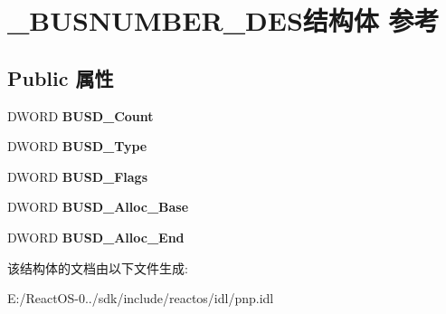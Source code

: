\hypertarget{struct___b_u_s_n_u_m_b_e_r___d_e_s}{}\section{\+\_\+\+B\+U\+S\+N\+U\+M\+B\+E\+R\+\_\+\+D\+E\+S结构体 参考}
\label{struct___b_u_s_n_u_m_b_e_r___d_e_s}
\subsection*{Public 属性}
\begin{DoxyCompactItemize}
\item 
\mbox{\label{struct___b_u_s_n_u_m_b_e_r___d_e_s_afd0ada43f638ac434c65653653af49df}} 
D\+W\+O\+RD {\bfseries B\+U\+S\+D\+\_\+\+Count}
\item 
\mbox{\label{struct___b_u_s_n_u_m_b_e_r___d_e_s_a9d095d940b0899429c6b247b5a2a5bb7}} 
D\+W\+O\+RD {\bfseries B\+U\+S\+D\+\_\+\+Type}
\item 
\mbox{\label{struct___b_u_s_n_u_m_b_e_r___d_e_s_a57b61447004a27130a711a3362eed333}} 
D\+W\+O\+RD {\bfseries B\+U\+S\+D\+\_\+\+Flags}
\item 
\mbox{\label{struct___b_u_s_n_u_m_b_e_r___d_e_s_a380de7553edad8fd1acf3e3d6498f935}} 
D\+W\+O\+RD {\bfseries B\+U\+S\+D\+\_\+\+Alloc\+\_\+\+Base}
\item 
\mbox{\label{struct___b_u_s_n_u_m_b_e_r___d_e_s_a9871465d9ddff4d643e7562e9f8830b0}} 
D\+W\+O\+RD {\bfseries B\+U\+S\+D\+\_\+\+Alloc\+\_\+\+End}
\end{DoxyCompactItemize}


该结构体的文档由以下文件生成\+:\begin{DoxyCompactItemize}
\item 
E\+:/\+React\+O\+S-\/0../sdk/include/reactos/idl/pnp.\+idl\end{DoxyCompactItemize}
